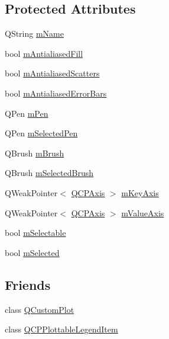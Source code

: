 \subsection*{Protected Attributes}
\begin{DoxyCompactItemize}
\item 
Q\-String \hyperlink{class_q_c_p_abstract_plottable_ac29ffef424e2488675930de18cde612a}{m\-Name}
\item 
bool \hyperlink{class_q_c_p_abstract_plottable_a152ac765bedf927fb240545d11d453ea}{m\-Antialiased\-Fill}
\item 
bool \hyperlink{class_q_c_p_abstract_plottable_aa115755e525a8e3a86dc683f9cab755b}{m\-Antialiased\-Scatters}
\item 
bool \hyperlink{class_q_c_p_abstract_plottable_ad48660b2bd301576e92fb033d8f455ea}{m\-Antialiased\-Error\-Bars}
\item 
Q\-Pen \hyperlink{class_q_c_p_abstract_plottable_a67bc0622fd1b9fa14e54c14922dcec66}{m\-Pen}
\item 
Q\-Pen \hyperlink{class_q_c_p_abstract_plottable_a10619472f5d5e10e9519a599f1cf5576}{m\-Selected\-Pen}
\item 
Q\-Brush \hyperlink{class_q_c_p_abstract_plottable_a33f00674c0161c13315ab9da0895418e}{m\-Brush}
\item 
Q\-Brush \hyperlink{class_q_c_p_abstract_plottable_aea3c0da30c7a8be23ad5f2d9bca36762}{m\-Selected\-Brush}
\item 
Q\-Weak\-Pointer$<$ \hyperlink{class_q_c_p_axis}{Q\-C\-P\-Axis} $>$ \hyperlink{class_q_c_p_abstract_plottable_a662bf0e9cd1ef88b17d784d9fa92689d}{m\-Key\-Axis}
\item 
Q\-Weak\-Pointer$<$ \hyperlink{class_q_c_p_axis}{Q\-C\-P\-Axis} $>$ \hyperlink{class_q_c_p_abstract_plottable_a1fce3d77798fff4d7501fbc43568b144}{m\-Value\-Axis}
\item 
bool \hyperlink{class_q_c_p_abstract_plottable_aceee52342c8e75727abcbd164986fdcb}{m\-Selectable}
\item 
bool \hyperlink{class_q_c_p_abstract_plottable_a43f68a0603e9bcd016bdfa6d9d5c41c9}{m\-Selected}
\end{DoxyCompactItemize}
\subsection*{Friends}
\begin{DoxyCompactItemize}
\item 
class \hyperlink{class_q_c_p_abstract_plottable_a1cdf9df76adcfae45261690aa0ca2198}{Q\-Custom\-Plot}
\item 
class \hyperlink{class_q_c_p_abstract_plottable_a104c78e91302afd6842a903e472f552f}{Q\-C\-P\-Plottable\-Legend\-Item}
\end{DoxyCompactItemize}


